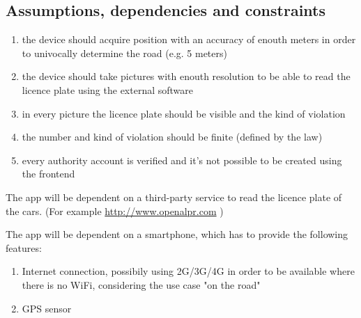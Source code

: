 \subsection{Assumptions, dependencies and constraints}
\begin{enumerate}[label=D]
\item the device should acquire position with an accuracy of enouth meters in order to univocally determine the road (e.g. 5 meters)
\item the device should take pictures with enouth resolution to be able to read the licence plate using the external software
\item in every picture the licence plate should be visible and the kind of violation
\item the number and kind of violation should be finite (defined by the law)
\item every authority account is verified and it's not possible to be created using the frontend
\
\end{enumerate}

The app will be dependent on a third-party service to read the licence plate of the cars. (For example \url{http://www.openalpr.com} )


The app will be dependent on a smartphone, which has to provide the following features:
\begin{enumerate}
  \item Internet connection, possibily using 2G/3G/4G in order to be available where there is no WiFi, considering the use case "on the road"
  \item GPS sensor 
\end{enumerate}
